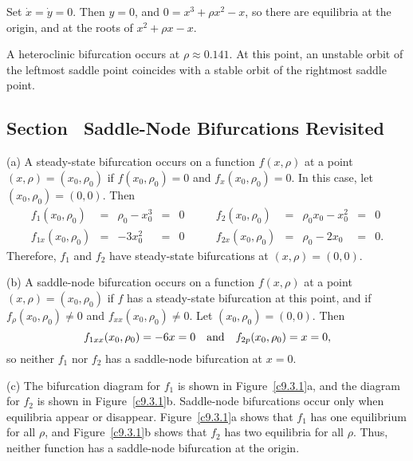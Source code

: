 \soln Set $\dot{x} = \dot{y} = 0$.  Then $y = 0$, and
$0 = x^3 + \rho x^2 - x$, so there are equilibria at the origin, and at
the roots of $x^2 + \rho x - x$.

A heteroclinic bifurcation occurs at $\rho \approx 0.141$.  At this
point, an unstable orbit of the leftmost saddle point coincides with a
stable orbit of the rightmost saddle point.



\subsection*{Section~\protect{\ref{S:SNB}} Saddle-Node Bifurcations Revisited}

(a) A steady-state bifurcation occurs on a function $f(x,\rho)$ at a
point $(x,\rho) = (x_0,\rho_0)$ if $f(x_0,\rho_0) = 0$ and
$f_x(x_0,\rho_0) = 0$.  In this case, let $(x_0,\rho_0) = (0,0)$.
Then
\[ \begin{array}{rcccl}
f_1(x_0,\rho_0) & = & \rho_0 - x_0^3 & = & 0 \\
f_{1x}(x_0,\rho_0) & = & -3x_0^2 & = & 0 \end{array}
\qquad
\begin{array}{rcccl}
f_2(x_0,\rho_0) & = & \rho_0x_0 - x_0^2 & = & 0 \\
f_{2x}(x_0,\rho_0) & = & \rho_0 - 2x_0 & = & 0. \end{array}
\]
Therefore, $f_1$ and $f_2$ have steady-state bifurcations at $(x,\rho)
= (0,0)$.

(b) A saddle-node bifurcation occurs on a function $f(x,\rho)$ at a point
$(x,\rho) = (x_0,\rho_0)$ if $f$ has a steady-state bifurcation at this
point, and if $f_\rho(x_0,\rho_0) \neq 0$ and $f_{xx}(x_0,\rho_0) \neq 0$.
Let $(x_0,\rho_0) = (0,0)$.  Then
\[
f_{1xx}(x_0,\rho_0) = -6x = 0 \quad\mbox{and}\quad
f_{2p}(x_0,\rho_0) = x = 0,
\]
so neither $f_1$ nor $f_2$ has a saddle-node bifurcation at $x = 0$.

(c) The bifurcation diagram for $f_1$ is shown in Figure~\ref{c9.3.1}a, and
the diagram for $f_2$ is shown in Figure~\ref{c9.3.1}b.  Saddle-node
bifurcations occur only when equilibria appear or disappear.
Figure~\ref{c9.3.1}a shows that $f_1$ has one equilibrium for all $\rho$,
and Figure~\ref{c9.3.1}b shows that $f_2$ has two equilibria for all
$\rho$.  Thus, neither function has a saddle-node bifurcation at the origin.

\begin{figure}[htb]
                       \centerline{%
                       }
\end{figure}

